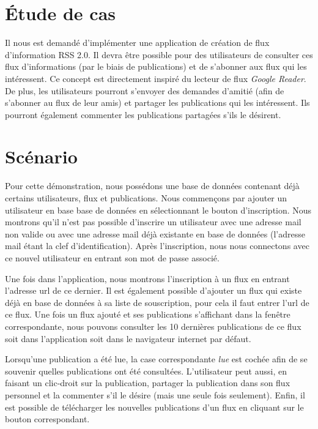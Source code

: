 \documentclass[a4paper,10pt]{article}
\begin{document}
\tableofcontents
\pagebreak

\section{Étude de cas}

Il nous est demandé d'implémenter une application de création de flux d'information RSS 2.0. Il devra être possible pour des utilisateurs de consulter ces flux d'informations (par le biais de publications) et de s'abonner aux flux qui les intéressent. Ce concept est directement inspiré du lecteur de flux \textsl{Google Reader}. De plus, les utilisateurs pourront s'envoyer des demandes d'amitié (afin de s'abonner au flux de leur amis) et partager les publications qui les intéressent. Ils pourront également commenter les publications partagées s'ils le désirent. 

\section{Scénario}

Pour cette démonstration, nous possédons une base de données contenant déjà certains utilisateurs, flux et publications. Nous commençons par ajouter un utilisateur en base base de données en sélectionnant le bouton d'inscription. Nous montrons qu'il n'est pas possible d'inscrire un utilisateur avec une adresse mail non valide ou avec une adresse mail déjà existante en base de données (l'adresse mail étant la clef d'identification). Après l'inscription, nous nous connectons avec ce nouvel utilisateur en entrant son mot de passe associé. 
\

Une fois dans l'application, nous montrons l'inscription à un flux en entrant l'adresse url de ce dernier. Il est également possible d'ajouter un flux qui existe déjà en base de données à sa liste de souscription, pour cela il faut entrer l'url de ce flux. Une fois un flux ajouté et ses publications s'affichant dans la fenêtre correspondante, nous pouvons consulter les 10 dernières publications de ce flux soit dans l'application soit dans le navigateur internet par défaut.
\

Lorsqu'une publication a été lue, la case correspondante \textsl{lue} est cochée afin de se souvenir quelles publications ont été consultées. L'utilisateur peut aussi, en faisant un clic-droit sur la publication, partager la publication dans son flux personnel et la commenter s'il le désire (mais une seule fois seulement). Enfin, il est possible de télécharger les nouvelles publications d'un flux en cliquant sur le bouton correspondant. 
\
\end{document}
